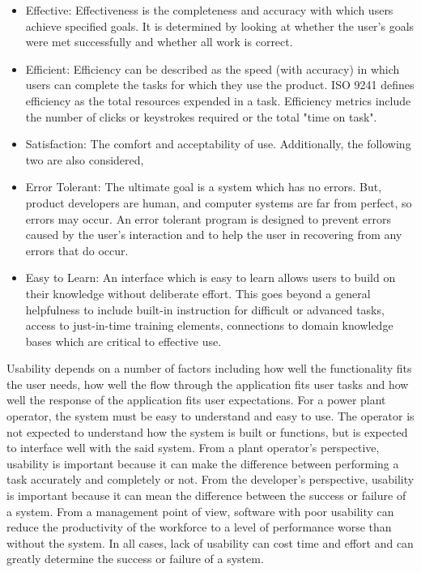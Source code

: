 \begin{itemize}

\item Effective: Effectiveness is the completeness and accuracy with which users achieve specified goals. It is determined by looking at whether the user's goals were met successfully and whether all work is correct.

\item Efficient: Efficiency can be described as the speed (with accuracy) in which users can complete the tasks for which they use the product. ISO 9241 defines efficiency as the total resources expended in a task. Efficiency metrics include the number of clicks or keystrokes required or the total "time on task".

\item Satisfaction: The comfort and acceptability of use. Additionally, the following two are also considered,

\item Error Tolerant: The ultimate goal is a system which has no errors. But, product developers are human, and computer systems are far from perfect, so errors may occur. An error tolerant program is designed to prevent errors caused by the user's interaction and to help the user in recovering from any errors that do occur.

\item Easy to Learn: An interface which is easy to learn allows users to build on their knowledge without deliberate effort. This goes beyond a general helpfulness to include built-in instruction for difficult or advanced tasks, access to just-in-time training elements, connections to domain knowledge bases which are critical to effective use.

\end{itemize}

Usability depends on a number of factors including how well the functionality fits the user needs, how well the flow through the application fits user tasks and how well the response of the application fits user expectations. For a power plant operator, the system must be easy to understand and easy to use. The operator is not expected to understand how the system is built or functions, but is expected to interface well with the said system. 
\newline
From a plant operator's perspective, usability is important because it can make the difference between performing a task accurately and completely or not. From the developer's perspective, usability is important because it can mean the difference between the success or failure of a system. From a management point of view, software with poor usability can reduce the productivity of the workforce to a level of performance worse than without the system. In all cases, lack of usability can cost time and effort and can greatly determine the success or failure of a system. 

